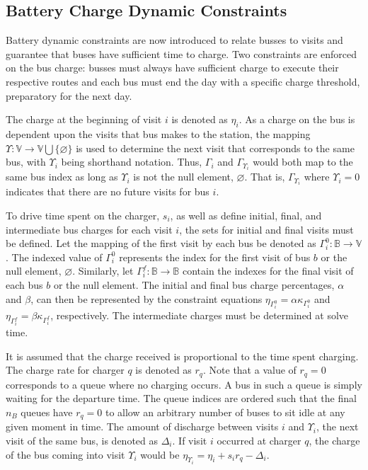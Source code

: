 \documentclass[11pt,a4paper,final]{article}
\begin{document}
\subsection{Battery Charge Dynamic Constraints}
\label{sec:batt_dynamics}
Battery dynamic constraints are now introduced to relate busses to visits and guarantee that buses have sufficient time
to charge. Two constraints are enforced on the bus charge: busses must always have sufficient charge to execute their
respective routes and each bus must end the day with a specific charge threshold, preparatory for the next day.

The charge at the beginning of visit \(i\) is denoted as \(\eta_i\). As a charge on the bus is dependent upon the visits that
bus makes to the station, the mapping \(\Upsilon: \mathbb{V} \rightarrow \mathbb{V} \bigcup \{\varnothing\}\) is used to determine the next visit
that corresponds to the same bus, with \(\Upsilon_i\) being shorthand notation. Thus, \(\Gamma_i\) and \(\Gamma_{\Upsilon_i}\) would both map to the
same bus index as long as \(\Upsilon_i\) is not the null element, \(\varnothing\). That is, \(\Gamma_{\Upsilon_i}\) where \(\Upsilon_i = 0\) indicates
that there are no future visits for bus \(i\).

To drive time spent on the charger, \(s_i\), as well as define initial, final, and intermediate bus charges for each visit
\(i\), the sets for initial and final visits must be defined. Let the mapping of the first visit by each bus be denoted as
\(\Gamma^0_i : \mathbb{B} \rightarrow \mathbb{V}\). The indexed value of \(\Gamma^0_i\) represents the index for the first visit of bus \(b\) or
the null element, \(\varnothing\). Similarly, let \(\Gamma^f_i : \mathbb{B} \rightarrow \mathbb{B}\) contain the indexes for the final
visit of each bus \(b\) or the null element. The initial and final bus charge percentages, \(\alpha\) and \(\beta\), can then be
represented by the constraint equations \(\eta_{\Gamma^0_i} = \alpha \kappa_{\Gamma^0_i}\) and \(\eta_{\Gamma^f_i} = \beta \kappa_{\Gamma^f_i}\), respectively. The
intermediate charges must be determined at solve time.

It is assumed that the charge received is proportional to the time spent charging. The charge rate for charger \(q\) is
denoted as \(r_q\). Note that a value of \(r_q = 0\) corresponds to a queue where no charging occurs. A bus in such a queue
is simply waiting for the departure time. The queue indices are ordered such that the final \(n_B\) queues have \(r_q = 0\)
to allow an arbitrary number of buses to sit idle at any given moment in time. The amount of discharge between visits
\(i\) and \(\Upsilon_i\), the next visit of the same bus, is denoted as \(\Delta_i\). If visit \(i\) occurred at charger \(q\), the charge of
the bus coming into visit \(\Upsilon_i\) would be \(\eta_{\Upsilon_i} = \eta_i + s_i r_q - \Delta_i\).
\end{document}
